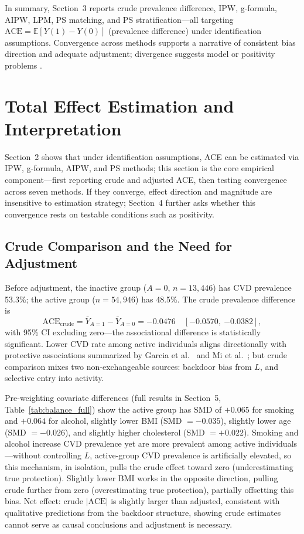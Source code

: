 \documentclass[12pt,a4paper]{article}
\newcommand{\E}{\mathbb{E}}
\begin{document}
In summary, Section~3 reports crude prevalence difference, IPW, g-formula, AIPW, LPM, PS matching, and PS stratification---all targeting $\mathrm{ACE}=\E[Y(1)-Y(0)]$ (prevalence difference) under identification assumptions. Convergence across methods supports a narrative of consistent bias direction and adequate adjustment; divergence suggests model or positivity problems \cite{shahu2023comparison,hernan2024whatif}.

\section{Total Effect Estimation and Interpretation}

Section~2 shows that under identification assumptions, ACE can be estimated via IPW, g-formula, AIPW, and PS methods; this section is the core empirical component---first reporting crude and adjusted ACE, then testing convergence across seven methods. If they converge, effect direction and magnitude are insensitive to estimation strategy; Section~4 further asks whether this convergence rests on testable conditions such as positivity.

\subsection{Crude Comparison and the Need for Adjustment}

Before adjustment, the inactive group ($A=0$, $n=13{,}446$) has CVD prevalence 53.3\%; the active group ($n=54{,}946$) has 48.5\%. The crude prevalence difference is
\[
\mathrm{ACE}_{\text{crude}}=\bar Y_{A=1}-\bar Y_{A=0}=-0.0476\quad[{-0.0570},\ {-0.0382}],
\]
with 95\% CI excluding zero---the associational difference is statistically significant. Lower CVD rate among active individuals aligns directionally with protective associations summarized by Garcia et al.\ \cite{garcia2023meta} and Mi et al.\ \cite{mi2025creview}; but crude comparison mixes two non-exchangeable sources: backdoor bias from $L$, and selective entry into activity.

Pre-weighting covariate differences (full results in Section~5, Table~\ref{tab:balance_full}) show the active group has SMD of $+0.065$ for smoking and $+0.064$ for alcohol, slightly lower BMI (SMD $=-0.035$), slightly lower age (SMD $=-0.026$), and slightly higher cholesterol (SMD $=+0.022$). Smoking and alcohol increase CVD prevalence yet are more prevalent among active individuals---without controlling $L$, active-group CVD prevalence is artificially elevated, so this mechanism, in isolation, pulls the crude effect toward zero (underestimating true protection). Slightly lower BMI works in the opposite direction, pulling crude further from zero (overestimating true protection), partially offsetting this bias. Net effect: crude $|\mathrm{ACE}|$ is slightly larger than adjusted, consistent with qualitative predictions from the backdoor structure, showing crude estimates cannot serve as causal conclusions and adjustment is necessary.
\end{document}
